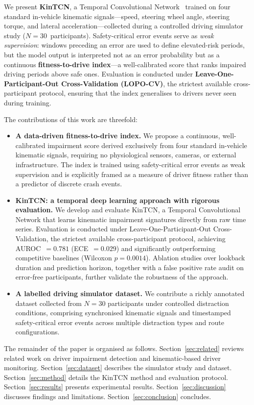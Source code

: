 We present \textbf{KinTCN}, a Temporal Convolutional Network~\cite{Bai2018} trained on
four standard in-vehicle kinematic signals---speed, steering wheel angle, steering torque,
and lateral acceleration---collected during a controlled driving simulator study
($N = 30$~participants).
Safety-critical error events serve as \textit{weak supervision}: windows preceding
an error are used to define elevated-risk periods, but the model output is interpreted
not as an error probability but as a continuous \textbf{fitness-to-drive index}---a
well-calibrated score that ranks impaired driving periods above safe ones.
Evaluation is conducted under \textbf{Leave-One-Participant-Out Cross-Validation (LOPO-CV)},
the strictest available cross-participant protocol, ensuring that the index generalises
to drivers never seen during training.

The contributions of this work are threefold:

\begin{itemize}
    \item \textbf{A data-driven fitness-to-drive index.}
          We propose a continuous, well-calibrated impairment score derived exclusively
          from four standard in-vehicle kinematic signals, requiring no physiological
          sensors, cameras, or external infrastructure.
          The index is trained using safety-critical error events as weak supervision
          and is explicitly framed as a measure of driver fitness rather than
          a predictor of discrete crash events.

    \item \textbf{KinTCN: a temporal deep learning approach with rigorous evaluation.}
          We develop and evaluate KinTCN, a Temporal Convolutional Network that learns
          kinematic impairment signatures directly from raw time series.
          Evaluation is conducted under Leave-One-Participant-Out Cross-Validation,
          the strictest available cross-participant protocol, achieving
          AUROC~$= 0.781$ (ECE~$= 0.029$) and significantly outperforming competitive
          baselines (Wilcoxon $p = 0.0014$).
          Ablation studies over lookback duration and prediction horizon, together with
          a false positive rate audit on error-free participants, further validate the
          robustness of the approach.

    \item \textbf{A labelled driving simulator dataset.}
          We contribute a richly annotated dataset collected from $N = 30$ participants
          under controlled distraction conditions, comprising synchronised kinematic
          signals and timestamped safety-critical error events across multiple
          distraction types and route configurations.
\end{itemize}

The remainder of the paper is organised as follows.
Section~\ref{sec:related} reviews related work on driver impairment detection and
kinematic-based driver monitoring.
Section~\ref{sec:dataset} describes the simulator study and dataset.
Section~\ref{sec:method} details the KinTCN method and evaluation protocol.
Section~\ref{sec:results} presents experimental results.
Section~\ref{sec:discussion} discusses findings and limitations.
Section~\ref{sec:conclusion} concludes.
